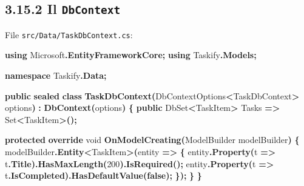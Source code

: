 \documentclass[
  italian,
  10pt,
]{book}
\newenvironment{Shaded}{\begin{snugshade}}{\end{snugshade}}
\newcommand{\DataTypeTok}[1]{\textcolor[rgb]{0.13,0.29,0.53}{#1}}
\newcommand{\DecValTok}[1]{\textcolor[rgb]{0.00,0.00,0.81}{#1}}
\newcommand{\FunctionTok}[1]{\textcolor[rgb]{0.13,0.29,0.53}{\textbf{#1}}}
\newcommand{\KeywordTok}[1]{\textcolor[rgb]{0.13,0.29,0.53}{\textbf{#1}}}
\newcommand{\NormalTok}[1]{#1}
\newcommand{\OperatorTok}[1]{\textcolor[rgb]{0.81,0.36,0.00}{\textbf{#1}}}
\begin{document}
\subsection{\texorpdfstring{3.15.2 Il
\texttt{DbContext}}{3.15.2 Il DbContext}}\label{il-dbcontext}

File \texttt{src/Data/TaskDbContext.cs}:

\begin{Shaded}
\begin{Highlighting}[]
\KeywordTok{using}\NormalTok{ Microsoft}\OperatorTok{.}\FunctionTok{EntityFrameworkCore}\OperatorTok{;}
\KeywordTok{using}\NormalTok{ Taskify}\OperatorTok{.}\FunctionTok{Models}\OperatorTok{;}

\KeywordTok{namespace}\NormalTok{ Taskify}\OperatorTok{.}\FunctionTok{Data}\OperatorTok{;}

\KeywordTok{public} \KeywordTok{sealed} \KeywordTok{class} \FunctionTok{TaskDbContext}\OperatorTok{(}\NormalTok{DbContextOptions}\OperatorTok{\textless{}}\NormalTok{TaskDbContext}\OperatorTok{\textgreater{}}\NormalTok{ options}\OperatorTok{)}
    \OperatorTok{:} \FunctionTok{DbContext}\OperatorTok{(}\NormalTok{options}\OperatorTok{)}
\OperatorTok{\{}
    \KeywordTok{public}\NormalTok{ DbSet}\OperatorTok{\textless{}}\NormalTok{TaskItem}\OperatorTok{\textgreater{}}\NormalTok{ Tasks }\OperatorTok{=\textgreater{}}\NormalTok{ Set}\OperatorTok{\textless{}}\NormalTok{TaskItem}\OperatorTok{\textgreater{}();}

    \KeywordTok{protected} \KeywordTok{override} \DataTypeTok{void} \FunctionTok{OnModelCreating}\OperatorTok{(}\NormalTok{ModelBuilder modelBuilder}\OperatorTok{)}
    \OperatorTok{\{}
\NormalTok{        modelBuilder}\OperatorTok{.}\FunctionTok{Entity}\OperatorTok{\textless{}}\NormalTok{TaskItem}\OperatorTok{\textgreater{}(}\NormalTok{entity }\OperatorTok{=\textgreater{}}
        \OperatorTok{\{}
\NormalTok{            entity}\OperatorTok{.}\FunctionTok{Property}\OperatorTok{(}\NormalTok{t }\OperatorTok{=\textgreater{}}\NormalTok{ t}\OperatorTok{.}\FunctionTok{Title}\OperatorTok{).}\FunctionTok{HasMaxLength}\OperatorTok{(}\DecValTok{200}\OperatorTok{).}\FunctionTok{IsRequired}\OperatorTok{();}
\NormalTok{            entity}\OperatorTok{.}\FunctionTok{Property}\OperatorTok{(}\NormalTok{t }\OperatorTok{=\textgreater{}}\NormalTok{ t}\OperatorTok{.}\FunctionTok{IsCompleted}\OperatorTok{).}\FunctionTok{HasDefaultValue}\OperatorTok{(}\KeywordTok{false}\OperatorTok{);}
        \OperatorTok{\});}
    \OperatorTok{\}}
\OperatorTok{\}}
\end{Highlighting}
\end{Shaded}
\end{document}
